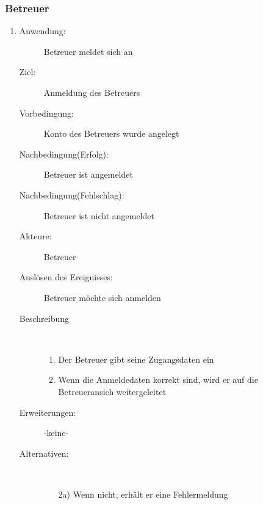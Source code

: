\documentclass[parskip=full]{scrartcl}
\newcommand{\swtLabel}[1]{\textbf{\textbackslash #1\arabic*0\textbackslash}}
\begin{document}
\subsubsection{Betreuer}
\begin{enumerate} [label=\swtLabel{B}]
  \item
	 \begin{description}
		\item[Anwendung:] Betreuer meldet sich an
  		\item[Ziel:] Anmeldung des Betreuers
  		\item[Vorbedingung:] Konto des Betreuers wurde angelegt
  		\item[Nachbedingung(Erfolg):] Betreuer ist angemeldet
  		\item[Nachbedingung(Fehlschlag):] Betreuer ist nicht angemeldet
  		\item[Akteure:] Betreuer
  		\item[Auslösen des Ereignisses:] Betreuer möchte sich anmelden
  		\item[Beschreibung]~
  		\begin{enumerate}
  			\item Der Betreuer gibt seine Zugangsdaten ein
  			\item Wenn die Anmeldedaten korrekt sind, wird er auf die Betreueransich
  			weitergeleitet
  		\end{enumerate}
  		\item[Erweiterungen:] -keine-
  		\item[Alternativen:] ~
  		\begin{enumerate}
  		  \item[2a)] Wenn nicht, erhält er eine Fehlermeldung
  		\end{enumerate}  
  	\end{description}
   

\end{enumerate}
\end{document}
